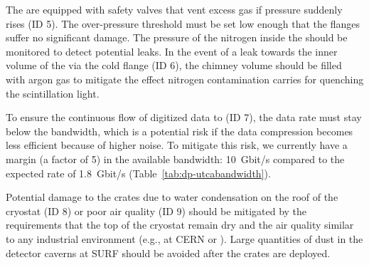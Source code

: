 The  are equipped with safety valves that vent excess gas if pressure suddenly rises (ID 5).  The over-pressure threshold must be set low enough that the flanges suffer no significant damage. The pressure of the nitrogen inside the  should be monitored to detect potential leaks. In the event of a leak towards the inner volume of the  via the cold flange (ID 6), the chimney volume should be filled with argon gas to mitigate the effect nitrogen contamination carries for quenching the scintillation light.  

To ensure the continuous flow of digitized data to  (ID 7), the data rate must stay below the  bandwidth, which is a potential risk if the data compression becomes less efficient because of higher noise. To mitigate this risk, we currently have a margin (a factor of \num{5}) in the available bandwidth: \SI{10}{Gbit/s}  compared to the expected rate of \SI{1.8}{Gbit/s} (Table~\ref{tab:dp-utcabandwidth}).

Potential damage to the  crates due to water condensation on the roof of the cryostat (ID 8) or poor air quality (ID 9) should be mitigated by the  requirements that the top of the cryostat remain dry and the air quality similar to any industrial environment (e.g., at CERN or ). Large quantities of dust in the detector caverns at SURF should be avoided after the  crates are deployed.
